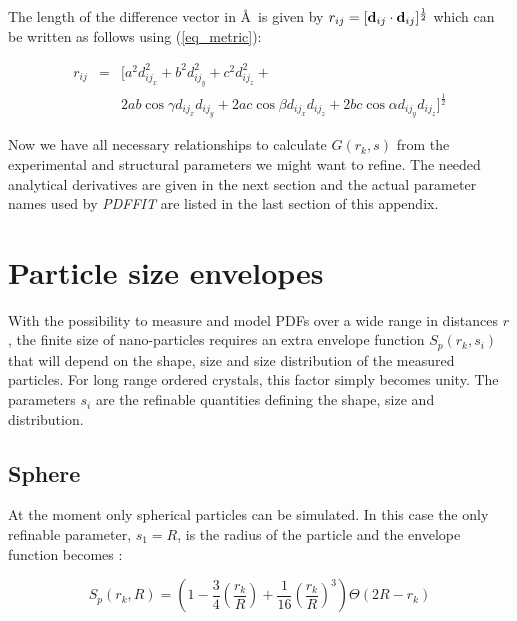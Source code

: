 \noindent
The length of the difference vector in \AA\ is given by
$r_{ij} = [{\bf d}_{ij} \cdot {\bf d}_{ij}] ^{\frac{1}{2}}$ which can
be written as follows using (\ref{eq_metric}):

\begin{eqnarray}
  r_{ij} & = & [ a^{2} d^{2}_{ij_{x}} +
                 b^{2} d^{2}_{ij_{y}} +
                 c^{2} d^{2}_{ij_{z}} + \nonumber \\
         &   &   2 ab \cos\gamma d_{ij_{x}}d_{ij_{y}} +
                 2 ac \cos\beta  d_{ij_{x}}d_{ij_{z}} +
                 2 bc \cos\alpha d_{ij_{y}}d_{ij_{z}} ] ^{\frac{1}{2}}
  \label{eq_met2}
\end{eqnarray}

Now we have all necessary relationships to calculate $G(r_{k},s)$ from
the experimental and structural parameters we might want to refine.
The needed analytical derivatives are given in the next section and the
actual parameter names used by {\it PDFFIT} are listed in the last
section of this appendix.


\section{Particle size envelopes}

With the possibility to measure and model PDFs over a wide range in
distances $r$, the finite size of nano-particles requires an extra
envelope function $S_{p}(r_{k},s_{i})$ that will depend on the
shape, size and size distribution of the measured particles. For
long range ordered crystals, this factor simply becomes unity. The
parameters $s_{i}$ are the refinable quantities defining the shape,
size and distribution.


\subsection*{Sphere}

At the moment only spherical particles can be simulated. In this
case the only refinable parameter, $s_{1}=R$, is the radius of the
particle and the envelope function becomes\cite{hoprco06} :

\begin{equation}
  S_{p}(r_{k},R) = \left ( 1 - \frac{3} {4} \left ( \frac{r_{k}}{R} \right )
                             + \frac{1}{16} \left ( \frac{r_{k}}{R} \right )^{3}
                          \right ) \Theta (2R - r_{k})
  \label{eq_shape_sphere}
\end{equation}

